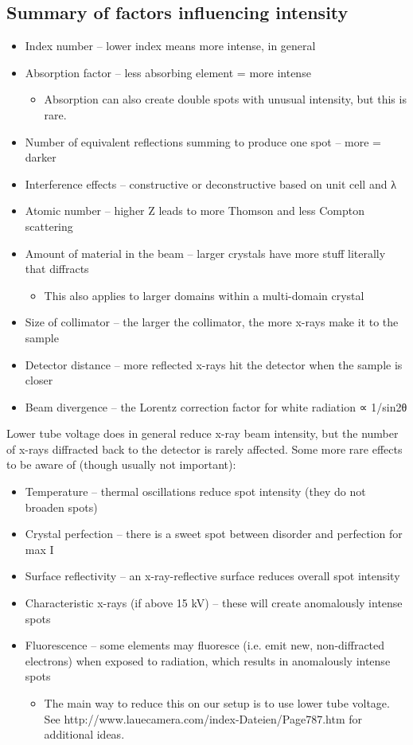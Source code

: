 \subsection{Summary of factors influencing intensity}
\begin{itemize}
    \item Index number – lower index means more intense, in general
    \item Absorption factor – less absorbing element = more intense
    \begin{itemize}
        \item Absorption can also create double spots with unusual intensity, but this is rare.
        \end{itemize}
    \item Number of equivalent reflections summing to produce one spot – more = darker
    \item Interference effects – constructive or deconstructive based on unit cell and λ
    \item Atomic number – higher Z leads to more Thomson and less Compton scattering
    \item Amount of material in the beam – larger crystals have more stuff literally that diffracts
    \begin{itemize}
        \item This also applies to larger domains within a multi-domain crystal
        \end{itemize}
    \item Size of collimator – the larger the collimator, the more x-rays make it to the sample
    \item Detector distance – more reflected x-rays hit the detector when the sample is closer
    \item Beam divergence – the Lorentz correction factor for white radiation ∝ 1/sin2θ
\end{itemize}
Lower tube voltage does in general reduce x-ray beam intensity, but the number of x-rays diffracted back to the detector is rarely affected.
Some more rare effects to be aware of (though usually not important):
\begin{itemize}
    \item Temperature – thermal oscillations reduce spot intensity (they do not broaden spots)
    \item Crystal perfection – there is a sweet spot between disorder and perfection for max I
    \item Surface reflectivity – an x-ray-reflective surface reduces overall spot intensity
    \item Characteristic x-rays (if above 15 kV) – these will create anomalously intense spots
    \item Fluorescence – some elements may fluoresce (i.e. emit new, non-diffracted electrons) when exposed to radiation, which results in anomalously intense spots
    \begin{itemize}
        \item The main way to reduce this on our setup is to use lower tube voltage. See http://www.lauecamera.com/index-Dateien/Page787.htm for additional ideas.
        \end{itemize}
\end{itemize}
